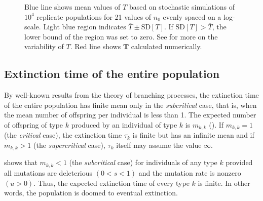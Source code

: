 \documentclass[9pt,lineno]{elife}
\begin{document}
\begin{figure}[ht!]
{%
Blue line shows mean values of $T$ based on stochastic simulations of $10^4$ replicate populations for 21 values of $n_0$ evenly spaced on a log-scale.
%
Light blue region indicates $\overline{T} \pm  \mathrm{SD}[T]$. If $\mathrm{SD}[T] > \overline{T}$, the lower bound of the region was set to zero.  See  for more on the variability of $T$.
%
Red line shows $\mathbf{T}$ calculated numerically.}
\label{fig:decay}
\label{figsupp:sf1}
\end{figure}


\subsection{Extinction time of the entire population}


By well-known results from the theory of branching processes, the extinction time of the entire population has finite mean only in the {\em subcritical} case, that is, when the mean number of offspring per individual is less than 1. 
The expected number of offspring of type $k$ produced by an individual of type $k$ is $m_{k,k}$ ().  
If $m_{k,k}=1$ (the \emph{critical} case), the extinction time $\tau_k$ is finite but has an infinite mean and if $m_{k,k} > 1$ (the {\em supercritical} case), $\tau_k$ itself may assume the value $\infty$.  

 shows that $m_{k,k} < 1$ (the {\em subcritical} case) for individuals of any type $k$ provided all mutations are deleterious $(0<s<1)$ and the mutation rate is nonzero $(u>0)$.  Thus, the expected extinction time of every type $k$ is finite.  
In other words, the population is doomed to eventual extinction.
\end{document}
